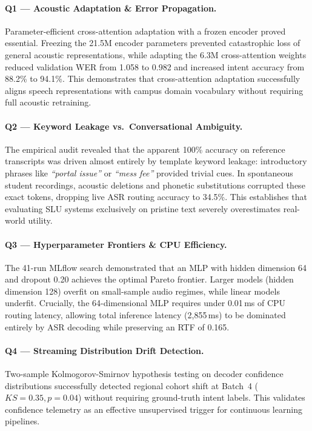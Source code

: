 \documentclass[sigconf,authordraft]{acmart}
\begin{document}
\paragraph{Q1 — Acoustic Adaptation \& Error Propagation.}
Parameter-efficient cross-attention adaptation with a frozen encoder proved essential.
Freezing the 21.5M encoder parameters prevented catastrophic loss of general acoustic representations,
while adapting the 6.3M cross-attention weights reduced validation WER from 1.058 to 0.982 and increased
intent accuracy from 88.2\% to 94.1\%. This demonstrates that cross-attention adaptation successfully
aligns speech representations with campus domain vocabulary without requiring full acoustic retraining.

\paragraph{Q2 — Keyword Leakage vs.\ Conversational Ambiguity.}
The empirical audit revealed that the apparent 100\% accuracy on reference transcripts was driven
almost entirely by template keyword leakage: introductory phrases like \emph{``portal issue''} or
\emph{``mess fee''} provided trivial cues. In spontaneous student recordings, acoustic deletions and
phonetic substitutions corrupted these exact tokens, dropping live ASR routing accuracy to 34.5\%.
This establishes that evaluating SLU systems exclusively on pristine text severely overestimates real-world utility.

\paragraph{Q3 — Hyperparameter Frontiers \& CPU Efficiency.}
The 41-run MLflow search demonstrated that an MLP with hidden dimension 64 and dropout 0.20
achieves the optimal Pareto frontier. Larger models (hidden dimension 128) overfit on small-sample
audio regimes, while linear models underfit. Crucially, the 64-dimensional MLP requires under 0.01\,ms
of CPU routing latency, allowing total inference latency (2,855\,ms) to be dominated entirely by
ASR decoding while preserving an RTF of 0.165.

\paragraph{Q4 — Streaming Distribution Drift Detection.}
Two-sample Kolmogorov-Smirnov hypothesis testing on decoder confidence distributions successfully
detected regional cohort shift at Batch~4 ($KS = 0.35, p = 0.04$) without requiring ground-truth intent
labels. This validates confidence telemetry as an effective unsupervised trigger for continuous learning pipelines.
\end{document}

